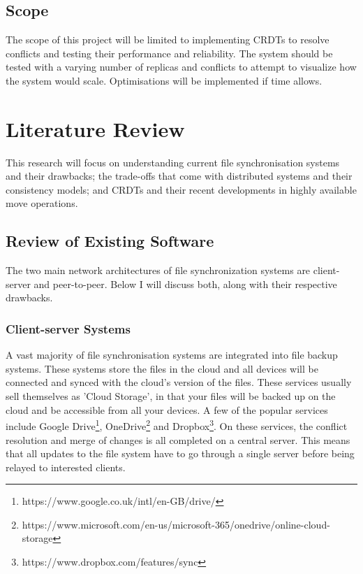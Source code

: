 \documentclass[12pt]{article}
\begin{document}
\subsection{Scope}
The scope of this project will be limited to implementing CRDTs to resolve conflicts and testing their performance and reliability. The system should be tested with a varying number of replicas and conflicts to attempt to visualize how the system would scale. Optimisations will be implemented if time allows.

\newpage
\section{Literature Review}
This research will focus on understanding current file synchronisation systems and their drawbacks; the trade-offs that come with distributed systems and their consistency models; and CRDTs and their recent developments in highly available move operations.

\subsection{Review of Existing Software}
The two main network architectures of file synchronization systems are client-server and peer-to-peer. Below I will discuss both, along with their respective drawbacks.


\subsubsection{Client-server Systems}
A vast majority of file synchronisation systems are integrated into file backup systems. These systems store the files in the cloud and all devices will be connected and synced with the cloud's version of the files. These services usually sell themselves as 'Cloud Storage', in that your files will be backed up on the cloud and be accessible from all your devices. A few of the popular services include Google Drive\footnote{https://www.google.co.uk/intl/en-GB/drive/}, OneDrive\footnote{https://www.microsoft.com/en-us/microsoft-365/onedrive/online-cloud-storage} and Dropbox\footnote{https://www.dropbox.com/features/sync}. On these services, the conflict resolution and merge of changes is all completed on a central server. This means that all updates to the file system have to go through a single server before being relayed to interested clients. \par
\end{document}
